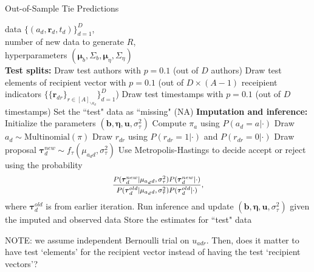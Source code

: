 \documentclass[12pt]{article}
\begin{document}
\begin{algorithm}[H]
	\caption{Out-of-Sample Tie Predictions}
	\label{alg:PPE}
	\begin{algorithmic}
		 data $ \{ (a_d, \boldsymbol{r}_d, t_d)\}_{d=1}^D$, \\
		number of new data to generate $R$,\\
		hyperparameters $(\boldsymbol{\mu}_b, \Sigma_b, \boldsymbol{\mu}_\eta, \Sigma_\eta)$\\
		\vskip 0.1in
		\textbf{Test splits:}	
		\STATE Draw test authors with $p=0.1$ (out of $D$ authors) 
		\STATE Draw test elements of recipient vector 
		with $p=0.1$ (out of $D\times (A-1)$ receipient indicators $\{\{\boldsymbol{r}_{dr}\}_{r\in [A]_{\backslash a_d}}\}_{d=1}^D$)
		\STATE Draw test timestamps with $p=0.1$  (out of $D$ timestamps) 
		\STATE Set the ``test" data as ``missing" (NA)
		\vskip 0.1in
		\textbf{Imputation and inference:}	
		\STATE Initialize the parameters $(\boldsymbol{b}, \boldsymbol{\eta}, \boldsymbol{u}, \sigma^2_\tau)$
		\STATE Compute $\pi_{a} $ using $P(a_d= a | \cdot)$
		\ENDFOR
		\STATE Draw $a_d \sim \mbox{Multinomial}(\pi)$
		\ENDIF
		\STATE Draw $r_{dr}$ using $P(r_{dr}= 1 | \cdot)$ and $P(r_{dr}= 0| \cdot)$ 
		\ENDIF
		\ENDFOR
		\STATE Draw proposal $\boldsymbol{\tau}^{new}_d \sim f_\tau(\mu_{a_dd}, \sigma^2_\tau)$
		\STATE Use Metropolis-Hastings to decide accept or reject using the probability
		\begin{equation*}
		\footnotesize
		\frac{P(\boldsymbol{\tau}^{new}_d|\mu_{a_dd}, \sigma^2_\tau) P(\boldsymbol{\tau}^{new}_d| \cdot)}{P(\boldsymbol{\tau}^{old}_d|\mu_{a_dd}, \sigma^2_\tau) P(\boldsymbol{\tau}^{old}_d| \cdot)},
		\end{equation*}
		where $\boldsymbol{\tau}^{old}_d$ is from earlier iteration.
		\ENDIF
		\STATE Run inference and update $(\boldsymbol{b}, \boldsymbol{\eta},\boldsymbol{u}, \sigma^2_\tau)$ given the imputed and observed data
		\ENDFOR
		\STATE Store the estimates for ``test" data
		\ENDFOR
	\end{algorithmic}
\end{algorithm}
NOTE: we assume independent Bernoulli trial on $u_{adr}$. Then, does it matter to have test `elements' for the recipient vector instead of having the test `recipient vectors'?
\end{document}
